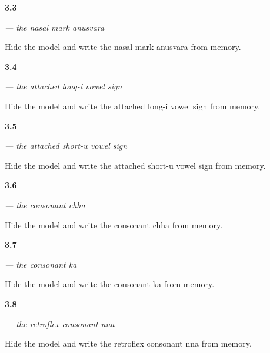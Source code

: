 \noindent\begin{minipage}[t]{\linewidth}
\raggedright
\hypertarget{review-GU-W03-anusvara-recall}{\textbf{3.3}} \emph{ — the nasal mark anusvara}\par
\small Hide the model and write the nasal mark anusvara from memory.
\end{minipage}\par\medskip

\noindent\begin{minipage}[t]{\linewidth}
\raggedright
\hypertarget{review-GU-W03-ii-matra-recall}{\textbf{3.4}} \emph{ — the attached long-i vowel sign}\par
\small Hide the model and write the attached long-i vowel sign from memory.
\end{minipage}\par\medskip

\noindent\begin{minipage}[t]{\linewidth}
\raggedright
\hypertarget{review-GU-W03-u-matra-recall}{\textbf{3.5}} \emph{ — the attached short-u vowel sign}\par
\small Hide the model and write the attached short-u vowel sign from memory.
\end{minipage}\par\medskip

\noindent\begin{minipage}[t]{\linewidth}
\raggedright
\hypertarget{review-GU-W03-chha-recall}{\textbf{3.6}} \emph{ — the consonant chha}\par
\small Hide the model and write the consonant chha from memory.
\end{minipage}\par\medskip

\noindent\begin{minipage}[t]{\linewidth}
\raggedright
\hypertarget{review-GU-W03-ka-recall}{\textbf{3.7}} \emph{ — the consonant ka}\par
\small Hide the model and write the consonant ka from memory.
\end{minipage}\par\medskip

\noindent\begin{minipage}[t]{\linewidth}
\raggedright
\hypertarget{review-GU-W03-nna-recall}{\textbf{3.8}} \emph{ — the retroflex consonant nna}\par
\small Hide the model and write the retroflex consonant nna from memory.
\end{minipage}\par\medskip

